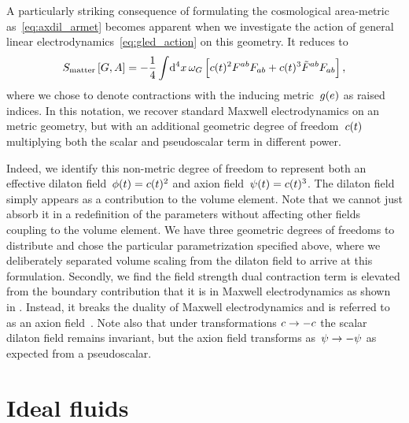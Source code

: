 
A particularly striking consequence of formulating the cosmological area-metric as~\eqref{eq:axdil_armet} becomes apparent when we investigate the action of general linear electrodynamics~\eqref{eq:gled_action} on this geometry. It reduces to
\begin{equation}
	\actmatter\left[\armet,\empot\right]=-\frac{1}{4}\intd{^4x}\volel_\armet\left[\scalec\oft^2\fstr^{ab}\fstr_{ab}+\scalec\oft^3\fstrdual^{ab}\fstr_{ab}\right]
	\eqpunct{,}
\end{equation}
where we chose to denote contractions with the inducing \FLRW{} metric~$g(e)$ as raised indices. In this notation, we recover standard Maxwell electrodynamics on an \FLRW{} metric geometry, but with an additional geometric degree of freedom~$c(t)$ multiplying both the scalar and pseudoscalar term in different power.

Indeed, we identify this non-metric degree of freedom to represent both an effective dilaton field~${\phi(t)=c(t)^2}$ and axion field~${\psi(t)=c(t)^3}$. The dilaton field simply appears as a contribution to the volume element. Note that we cannot just absorb it in a redefinition of the parameters without affecting other fields coupling to the volume element. We have three geometric degrees of freedoms to distribute and chose the particular parametrization specified above, where we deliberately separated volume scaling from the dilaton field to arrive at this formulation. Secondly, we find the field strength dual contraction term is elevated from the boundary contribution that it is in Maxwell electrodynamics as shown in . Instead, it breaks the duality of Maxwell electrodynamics and is referred to as an axion field~\autocite{Visinelli2011}. Note also that under transformations ${c\to-c}$ the scalar dilaton field remains invariant, but the axion field transforms as~${\psi\to-\psi}$ as expected from a pseudoscalar.


\section{Ideal fluids}\label{sec:fluids}


